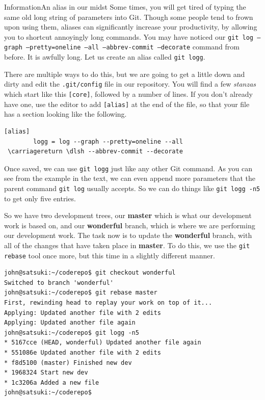 \begin{callout}{Information}{An alias in our midst}
Some times, you will get tired of typing the same old long string of parameters into Git.  Though some people tend to frown upon using them, aliases can significantly increase your productivity, by allowing you to shortcut annoyingly long commands.  You may have noticed our \texttt{git log --graph --pretty=oneline --all --abbrev-commit --decorate} command from before.  It is awfully long.  Let us create an alias called \texttt{git logg}.  

There are multiple ways to do this, but we are going to get a little down and dirty and edit the \texttt{.git/config} file in our repository.  You will find a few \emph{stanzas} which start like this \texttt{[core]}, followed by a number of lines.  If you don't already have one, use the editor to add \texttt{[alias]} at the end of the file, so that your file has a section looking like the following.

\begin{Verbatim}
[alias]
        logg = log --graph --pretty=oneline --all 
 \carriagereturn \dlsh --abbrev-commit --decorate
\end{Verbatim}

Once saved, we can use \texttt{git logg} just like any other Git command.  As you can see from the example in the text, we can even append more parameters that the parent command \texttt{git log} usually accepts.  So we can do things like \texttt{git logg -n5} to get only five entries.
\end{callout}

So we have two development trees, our \textbf{master} which is what our development work is based on, and our \textbf{wonderful} branch, which is where we are performing our development work.  The task now is to update the \textbf{wonderful} branch, with all of the changes that have taken place in \textbf{master}.  To do this, we use the \texttt{git rebase} tool once more, but this time in a slightly different manner.

\begin{Verbatim}
john@satsuki:~/coderepo$ git checkout wonderful 
Switched to branch 'wonderful'
john@satsuki:~/coderepo$ git rebase master
First, rewinding head to replay your work on top of it...
Applying: Updated another file with 2 edits
Applying: Updated another file again
john@satsuki:~/coderepo$ git logg -n5
* 5167cce (HEAD, wonderful) Updated another file again
* 551086e Updated another file with 2 edits
* f8d5100 (master) Finished new dev
* 1968324 Start new dev
* 1c3206a Added a new file
john@satsuki:~/coderepo$ 
\end{Verbatim}


